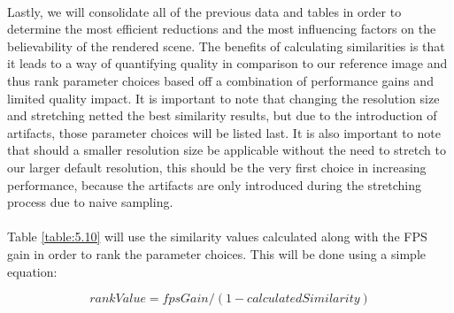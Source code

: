 \paragraph{}
Lastly, we will consolidate all of the previous data and tables in order to determine the most efficient reductions and the most influencing factors on the believability of the rendered scene.  The benefits of calculating similarities is that it leads to a way of quantifying quality in comparison to our reference image and thus rank parameter choices based off a combination of performance gains and limited quality impact.  It is important to note that changing the resolution size and stretching netted the best similarity results, but due to the introduction of artifacts, those parameter choices will be listed last.  It is also important to note that should a smaller resolution size be applicable without the need to stretch to our larger default resolution, this should be the very first choice in increasing performance, because the artifacts are only introduced during the stretching process due to naive sampling.

\paragraph{}
Table \ref{table:5.10} will use the similarity values calculated along with the FPS gain in order to rank the parameter choices.  This will be done using a simple equation:

\begin{equation}
rankValue = fpsGain / (1-calculatedSimilarity)
\end{equation}

